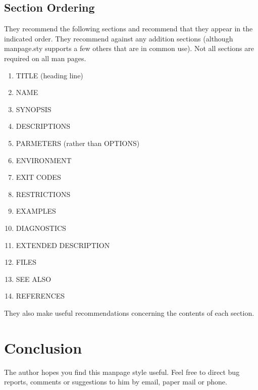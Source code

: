 \subsection{Section Ordering}
They recommend the following sections and recommend that they appear
in the indicated order.  They recommend against any addition sections
(although manpage.sty supports a few others that are in common use).
Not all sections are required on all man pages.
  \begin{enumerate}
    \item TITLE (heading line)
    \item NAME
    \item SYNOPSIS
    \item DESCRIPTIONS
    \item PARMETERS (rather than OPTIONS)
    \item ENVIRONMENT
    \item EXIT CODES
    \item RESTRICTIONS
    \item EXAMPLES
    \item DIAGNOSTICS
    \item EXTENDED DESCRIPTION
    \item FILES
    \item SEE ALSO
    \item REFERENCES
  \end{enumerate}

They also make useful recommendations concerning the contents of each
section.

\section{Conclusion}
The author hopes you find this manpage style useful.  Feel free to
direct bug reports, comments or suggestions to him by email, paper
mail or phone.

